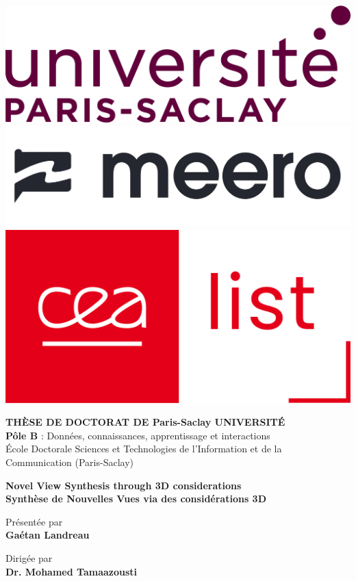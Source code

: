 \begin{titlepage}

  \vspace*{-2.5cm}
  \includegraphics[height=0.1\columnwidth]{images/saclay.png}
  \hspace*{.5cm}
  \includegraphics[height=0.1\columnwidth]{images/meero.jpg}
  \hspace*{.5cm}
  \includegraphics[height=0.1\columnwidth]{images/cea_list.png}
  \vspace*{0.5cm}

  \begin{center}

    {\large \textbf{T\normalsize{HÈSE DE}\large{} D\normalsize{OCTORAT DE}\large{} P\normalsize{aris}\large{}-S\normalsize{aclay}\large{} U\normalsize{NIVERSITÉ}}}\\
    \textbf{Pôle B} : Données, connaissances, apprentissage et interactions \\
    École Doctorale Sciences et Technologies de l'Information et de la Communication (Paris-Saclay)

    \vspace*{1.5cm}

    {\Large \textbf{Novel View Synthesis through 3D considerations}} \\[0.5em]
    {\large \textbf{Synthèse de Nouvelles Vues via des considérations 3D}}

    \vspace*{1.2cm}

    Présentée par\\
    {\large \textbf{Gaétan {Landreau}}}

    \vspace*{2mm}

    Dirigée par\\
    \textbf{Dr. Mohamed {Tamaazousti}}

    \vspace*{5mm}


\end{center}
\end{titlepage}
